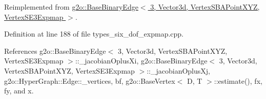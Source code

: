 Reimplemented from \hyperlink{classg2o_1_1BaseBinaryEdge_af0fb8a693c8c7996fa65566e7263fbc4}{g2o\+::\+Base\+Binary\+Edge$<$ 3, Vector3d, Vertex\+S\+B\+A\+Point\+X\+Y\+Z, Vertex\+S\+E3\+Expmap $>$}.



Definition at line 188 of file types\+\_\+six\+\_\+dof\+\_\+expmap.\+cpp.



References g2o\+::\+Base\+Binary\+Edge$<$ 3, Vector3d, Vertex\+S\+B\+A\+Point\+X\+Y\+Z, Vertex\+S\+E3\+Expmap $>$\+::\+\_\+jacobian\+Oplus\+Xi, g2o\+::\+Base\+Binary\+Edge$<$ 3, Vector3d, Vertex\+S\+B\+A\+Point\+X\+Y\+Z, Vertex\+S\+E3\+Expmap $>$\+::\+\_\+jacobian\+Oplus\+Xj, g2o\+::\+Hyper\+Graph\+::\+Edge\+::\+\_\+vertices, bf, g2o\+::\+Base\+Vertex$<$ D, T $>$\+::estimate(), fx, fy, and x.


